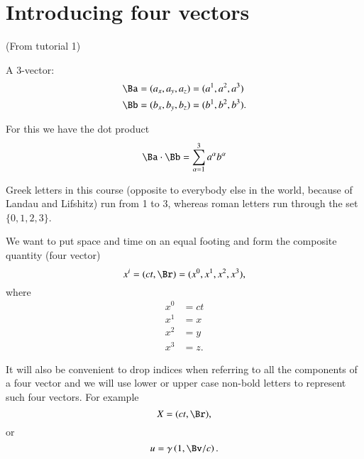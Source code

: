 %
%
\section{Introducing four vectors}

(From tutorial 1)

A 3-vector:
%
\begin{equation}\label{eqn:relativisticElectrodynamicsT1:10}
\begin{aligned}
\Ba &= (a_x, a_y, a_z) = (a^1, a^2, a^3) \\
\Bb &= (b_x, b_y, b_z) = (b^1, b^2, b^3).
\end{aligned}
\end{equation}

For this we have the dot product
\begin{equation}\label{eqn:relativisticElectrodynamicsT1:20}
\Ba \cdot \Bb = \sum_{\alpha=1}^3 a^\alpha b^\alpha
\end{equation}

Greek letters in this course (opposite to everybody else in the world, because of Landau and Lifshitz) run from 1 to 3, whereas roman letters run through the set \(\{0,1,2,3\}\).

We want to put space and time on an equal footing and form the composite quantity (four vector)
\begin{equation}\label{eqn:relativisticElectrodynamicsT1:40}
x^i = (ct, \Br) = (x^0, x^1, x^2, x^3),
\end{equation}
where
\begin{equation}\label{eqn:relativisticElectrodynamicsT1:80}
\begin{aligned}
x^0 &= ct \\
x^1 &= x \\
x^2 &= y \\
x^3 &= z.
\end{aligned}
\end{equation}

It will also be convenient to drop indices when referring to all the components of a four vector and we will use lower or upper case non-bold letters to represent such four vectors.  For example
%
\begin{equation}\label{eqn:relativisticElectrodynamicsT1:81}
X = (ct, \Br),
\end{equation}
or
\begin{equation}\label{eqn:relativisticElectrodynamicsT1:82}
u = \gamma \left(1, \Bv/c \right).
\end{equation}


